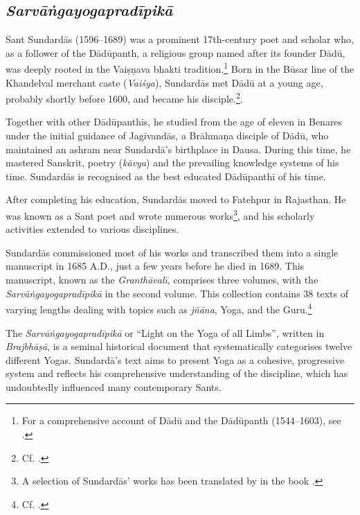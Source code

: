 \subsection{\emph{Sarvāṅgayogapradīpikā}}

Sant Sundardās (1596–1689) was a prominent 17th-century poet and scholar who, as a follower of the Dādūpanth, a religious group named after its founder Dādū, was deeply rooted in the Vaiṣṇava bhakti tradition.\footnote{For a comprehensive account of Dādū and the Dādūpanth (1544–1603), see \citeauthor[2023: 71–77]{horstmann2023shrine}.} Born in the Būsar line of the Khandelval merchant caste (\textit{Vaiśya}), Sundardās met Dādū at a young age, probably shortly before 1600, and became his disciple.\footnote{Cf. \citeauthor[2023: 86]{horstmann2023shrine}.}.

Together with other Dādūpanthīs, he studied from the age of eleven in Benares under the initial guidance of Jagīvandās, a Brāhmaṇa disciple of Dādū, who maintained an ashram near Sundardā's birthplace in Dausa. During this time, he mastered Sanskrit, poetry (\textit{kāvya}) and the prevailing knowledge systems of his time. Sundardās is recognised as the best educated Dādūpanthī of his time.

After completing his education, Sundardās moved to Fatehpur in Rajasthan. He was known as a Sant poet and wrote numerous works\footnote{A selection of Sundardās' works has been translated by \citeauthor{horstmann2023shrine} in the book .}, and his scholarly activities extended to various disciplines.

Sundardās commissioned most of his works and transcribed them into a single manuscript in 1685 A.D., just a few years before he died in 1689. This manuscript, known as the \emph{Granthāvalī}, comprises three volumes, with the \emph{Sarvāṅgayogapradīpikā} in the second volume. This collection contains 38 texts of varying lengths dealing with topics such as \textit{jñāna}, Yoga, and the Guru.\footnote{Cf. \citeauthor[2014: 685]{burger2014sarvangayogapradipika}.}

The \emph{Sarvāṅgayogapradīpikā} or ``Light on the Yoga of all Limbs'', written in \textit{Brajbhāṣā}, is a seminal historical document that systematically categorises twelve different Yogas. Sundardā's text aims to present Yoga as a cohesive, progressive system and reflects his comprehensive understanding of the discipline, which has undoubtedly influenced many contemporary Sants.

